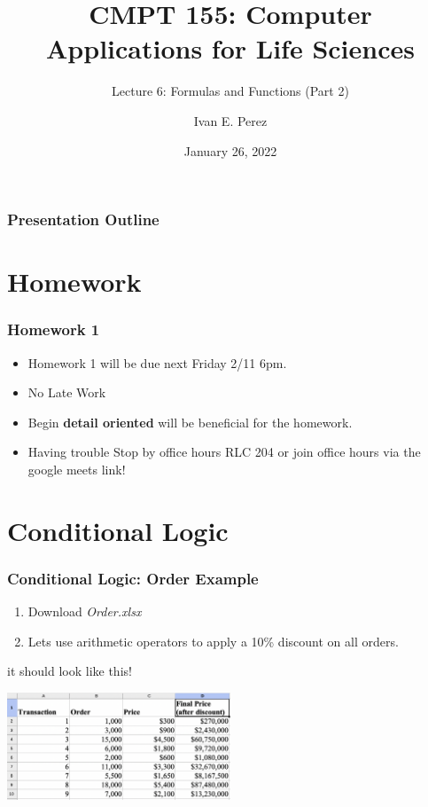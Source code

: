\documentclass[12pt]{beamer}
\title{CMPT 155: Computer Applications for Life Sciences}
\subtitle{Lecture 6: Formulas and Functions (Part 2)}
\author{Ivan E. Perez}
\institute{}
\date{January 26, 2022}
\begin{document}
	
	\begin{frame}
		\titlepage
	\end{frame}
	
	\begin{frame}
		\frametitle{Presentation Outline}
		\tableofcontents
	\end{frame}
	\section{Homework}
	
	\begin{frame}
		\frametitle{Homework 1}
		\begin{itemize}
			\item Homework 1 will be due next Friday 2/11 6pm. 
			\item No Late Work
			\item Begin \textbf{detail oriented} will be beneficial for the homework.
			\item Having trouble Stop by office hours RLC 204 or join office hours via the google meets link!
		\end{itemize}
	\end{frame}
\section{Conditional Logic}
	\begin{frame}
		\frametitle{Conditional Logic: Order Example}
		\begin{enumerate}
			\item Download \textit{Order.xlsx}
			\item Lets use arithmetic operators to apply a 10\% discount on all orders.
		\end{enumerate}
	it should look like this!
	\begin{center}
		\includegraphics[width=0.5\textwidth]{Order.png}
	\end{center}
	\end{frame}
\end{document}
